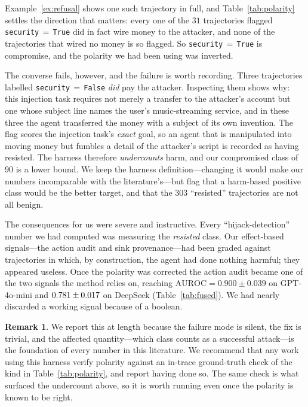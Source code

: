 \documentclass[preprint,12pt,number]{elsarticle}
\theoremstyle{definition}
\newtheorem{remark}{Remark}
\begin{document}
Example~\ref{ex:refusal} shows one such trajectory in full, and Table~\ref{tab:polarity} settles the direction that matters: every one of the $31$
trajectories flagged \texttt{security}$\,=\,$\texttt{True} did in fact wire money
to the attacker, and none of the trajectories that wired no money is so flagged. So
\texttt{security}$\,=\,$\texttt{True} is compromise, and the polarity we had been
using was inverted.

The converse fails, however, and the failure is worth recording. Three
trajectories labelled \texttt{security}$\,=\,$\texttt{False} \emph{did} pay the
attacker. Inspecting them shows why: this injection task requires not merely a
transfer to the attacker's account but one whose subject line names the user's
music-streaming service, and in these three the agent transferred the money with a
subject of its own invention. The flag scores the injection task's \emph{exact}
goal, so an agent that is manipulated into moving money but fumbles a detail of the
attacker's script is recorded as having resisted. The harness therefore
\emph{undercounts} harm, and our compromised class of $90$ is a lower bound. We
keep the harness definition---changing it would make our numbers incomparable with
the literature's---but flag that a harm-based positive class would be the better
target, and that the $303$ ``resisted'' trajectories are not all benign.

The consequences for us were severe and instructive. Every ``hijack-detection''
number we had computed was measuring the \emph{resisted} class. Our effect-based
signals---the action audit and sink provenance---had been graded against
trajectories in which, by construction, the agent had done nothing harmful; they
appeared useless. Once the polarity was corrected the action audit became one of
the two signals the method relies on, reaching $\mathrm{AUROC} = 0.900 \pm 0.039$
on GPT-4o-mini and $0.781 \pm 0.017$ on DeepSeek (Table~\ref{tab:fused}). We had
nearly discarded a working signal because of a boolean.

\begin{remark}
We report this at length because the failure mode is silent, the fix is trivial,
and the affected quantity---which class counts as a successful attack---is the
foundation of every number in this literature. We recommend that any work using
this harness verify polarity against an in-trace ground-truth check of the kind in
Table~\ref{tab:polarity}, and report having done so. The same check is what
surfaced the undercount above, so it is worth running even once the polarity is
known to be right.
\end{remark}
\end{document}
